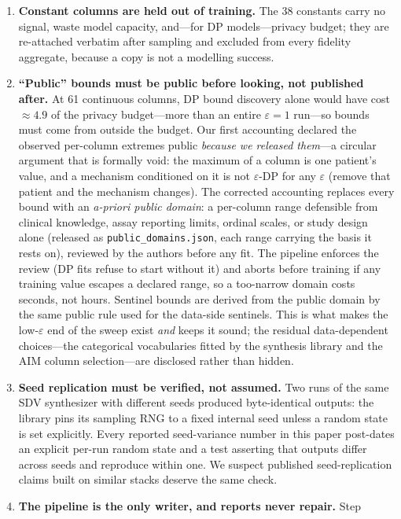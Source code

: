 \documentclass[11pt,a4paper]{article}
\newcommand{\eps}{\ensuremath{\varepsilon}}
\begin{document}
\begin{enumerate}
near-uniqueness safety net ($>90\%$-unique string columns are dropped), which now
runs regardless of declared types.
\item \textbf{Constant columns are held out of training.} The 38 constants carry no
signal, waste model capacity, and---for DP models---privacy budget; they are
re-attached verbatim after sampling and excluded from every fidelity aggregate,
because a copy is not a modelling success.
\item \textbf{``Public'' bounds must be public before looking, not published
after.} At 61 continuous columns, DP bound discovery alone would have cost
${\approx}4.9$ of the privacy budget---more than an entire $\eps = 1$ run---so
bounds must come from outside the budget. Our first accounting declared the
observed per-column extremes public \emph{because we released them}---a circular
argument that is formally void: the maximum of a column is one patient's value,
and a mechanism conditioned on it is not $\eps$-DP for any $\eps$ (remove that
patient and the mechanism changes). The corrected accounting replaces every bound
with an \emph{a-priori public domain}: a per-column range defensible from clinical
knowledge, assay reporting limits, ordinal scales, or study design alone
(released as \texttt{public\_domains.json}, each range carrying the basis it
rests on), reviewed by the authors before any fit. The pipeline enforces the
review (DP fits refuse to start without it) and aborts before training if any
training value escapes a declared range, so a too-narrow domain costs seconds,
not hours. Sentinel bounds are derived from the public domain by the same
public rule used for the data-side sentinels. This is what makes the low-\eps{}
end of the sweep exist \emph{and} keeps it sound; the residual data-dependent
choices---the categorical vocabularies fitted by the synthesis library and the
AIM column selection---are disclosed rather than hidden.
\item \textbf{Seed replication must be verified, not assumed.} Two runs of the same
SDV synthesizer with different seeds produced byte-identical outputs: the library
pins its sampling RNG to a fixed internal seed unless a random state is set
explicitly. Every reported seed-variance number in this paper post-dates an explicit
per-run random state and a test asserting that outputs differ across seeds and
reproduce within one. We suspect published seed-replication claims built on similar
stacks deserve the same check.
\item \textbf{The pipeline is the only writer, and reports never repair.} Step

\end{enumerate}
\end{document}
